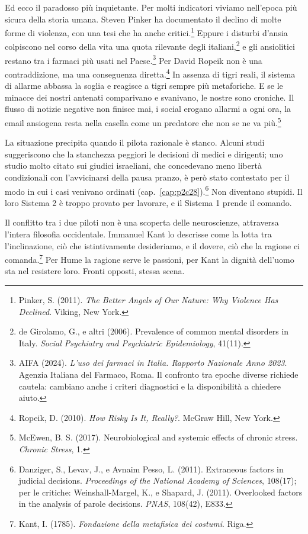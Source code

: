 Ed ecco il paradosso più inquietante. Per molti indicatori viviamo nell'epoca più sicura della storia umana. Steven Pinker ha documentato il declino di molte forme di violenza, con una tesi che ha anche critici.\footnote{Pinker, S. (2011). \textit{The Better Angels of Our Nature: Why Violence Has Declined}. Viking, New York.} Eppure i disturbi d'ansia colpiscono nel corso della vita una quota rilevante degli italiani,\footnote{de Girolamo, G., e altri (2006). Prevalence of common mental disorders in Italy. \textit{Social Psychiatry and Psychiatric Epidemiology}, 41(11).} e gli ansiolitici restano tra i farmaci più usati nel Paese.\footnote{AIFA (2024). \textit{L'uso dei farmaci in Italia. Rapporto Nazionale Anno 2023}. Agenzia Italiana del Farmaco, Roma. Il confronto tra epoche diverse richiede cautela: cambiano anche i criteri diagnostici e la disponibilità a chiedere aiuto.} Per David Ropeik non è una contraddizione, ma una conseguenza diretta.\footnote{Ropeik, D. (2010). \textit{How Risky Is It, Really?}. McGraw Hill, New York.} In assenza di tigri reali, il sistema di allarme abbassa la soglia e reagisce a tigri sempre più metaforiche. E se le minacce dei nostri antenati comparivano e svanivano, le nostre sono croniche. Il flusso di notizie negative non finisce mai, i social erogano allarmi a ogni ora, la email ansiogena resta nella casella come un predatore che non se ne va più.\footnote{McEwen, B. S. (2017). Neurobiological and systemic effects of chronic stress. \textit{Chronic Stress}, 1.}

La situazione precipita quando il pilota razionale è stanco. Alcuni studi suggeriscono che la stanchezza peggiori le decisioni di medici e dirigenti; uno studio molto citato sui giudici israeliani, che concedevano meno libertà condizionali con l'avvicinarsi della pausa pranzo, è però stato contestato per il modo in cui i casi venivano ordinati (cap.~\ref{cap:p2c28}).\footnote{Danziger, S., Levav, J., e Avnaim Pesso, L. (2011). Extraneous factors in judicial decisions. \textit{Proceedings of the National Academy of Sciences}, 108(17); per le critiche: Weinshall-Margel, K., e Shapard, J. (2011). Overlooked factors in the analysis of parole decisions. \textit{PNAS}, 108(42), E833.} Non diventano stupidi. Il loro Sistema 2 è troppo provato per lavorare, e il Sistema 1 prende il comando.

Il conflitto tra i due piloti non è una scoperta delle neuroscienze, attraversa l'intera filosofia occidentale. Immanuel Kant lo descrisse come la lotta tra l'inclinazione, ciò che istintivamente desideriamo, e il dovere, ciò che la ragione ci comanda.\footnote{Kant, I. (1785). \textit{Fondazione della metafisica dei costumi}. Riga.} Per Hume la ragione serve le passioni, per Kant la dignità dell'uomo sta nel resistere loro. Fronti opposti, stessa scena.

